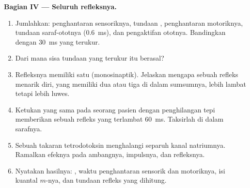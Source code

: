 \begin{problem}
\medskip
\noindent\textbf{Bagian IV --- Seluruh refleksnya.}
\begin{enumerate}[resume]
  \item Jumlahkan: penghantaran sensoriknya, tundaan ,
        penghantaran motoriknya, tundaan saraf-ototnya (\qty{0.6}{ms}),
        dan pengaktifan ototnya. Bandingkan dengan \qty{30}{ms} yang
        terukur.
  \item Dari mana sisa tundaan yang terukur itu berasal?
  \item Refleksnya memiliki satu  (monosinaptik). Jelaskan
        mengapa sebuah refleks menarik diri, yang memiliki dua atau
        tiga  di dalam sumsumnya, lebih lambat tetapi lebih
        luwes.
  \item Ketukan yang sama pada seorang pasien dengan penghilangan
         tepi memberikan sebuah refleks yang terlambat
        \qty{60}{ms}. Taksirlah  di dalam sarafnya.
  \item Sebuah takaran tetrodotoksin menghalangi separuh kanal
        natriumnya. Ramalkan efeknya pada ambangnya, impulsnya, dan
        refleksnya.
  \item Nyatakan hasilnya: , waktu penghantaran
        sensorik dan motoriknya, isi kuantal $m$-nya, dan tundaan
        refleks yang dihitung.
\end{enumerate}
\end{problem}
